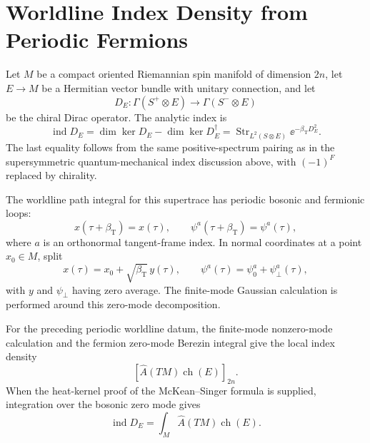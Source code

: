 \section{Worldline Index Density from Periodic Fermions}

\begin{definition}
\label{def:twisted-dirac-index-periodic-worldline-datum}
Let \(M\) be a compact oriented Riemannian spin manifold of dimension
\(2n\), let \(E\to M\) be a Hermitian vector bundle with unitary connection,
and let
\[
  D_E:\Gamma(S^+\otimes E)\longrightarrow\Gamma(S^-\otimes E)
\]
be the chiral Dirac operator.  The analytic index is
\[
  \operatorname{ind}D_E
  =
  \dim\ker D_E-\dim\ker D_E^\dagger
  =
  \operatorname{Str}_{L^2(S\otimes E)}
  \ee^{-\beta_{\mathrm T}D_E^2}.
\]
The last equality follows from the same positive-spectrum pairing as in the
supersymmetric quantum-mechanical index discussion above, with \((-1)^F\)
replaced by chirality.

The worldline path integral for this supertrace has periodic bosonic and
fermionic loops:
\[
  x(\tau+\beta_{\mathrm T})=x(\tau),
  \qquad
  \psi^a(\tau+\beta_{\mathrm T})=\psi^a(\tau),
\]
where \(a\) is an orthonormal tangent-frame index.  In normal coordinates at
a point \(x_0\in M\), split
\[
  x(\tau)=x_0+\sqrt{\beta_{\mathrm T}}\,y(\tau),
  \qquad
  \psi^a(\tau)=\psi_0^a+\psi_{\perp}^a(\tau),
\]
with \(y\) and \(\psi_\perp\) having zero average.  The finite-mode Gaussian
calculation is performed around this zero-mode decomposition.
\end{definition}

\begin{example}
\label{ex:periodic-fermion-worldline-index-density}
For the preceding periodic worldline datum, the finite-mode nonzero-mode
calculation and the fermion zero-mode Berezin integral give the local index
density
\[
  \left[
    \widehat A(TM)\operatorname{ch}(E)
  \right]_{2n}.
\]
When the heat-kernel proof of the McKean--Singer formula is supplied, integration
over the bosonic zero mode gives
\[
  \operatorname{ind}D_E
  =
  \int_M\widehat A(TM)\operatorname{ch}(E).
\]
\end{example}

